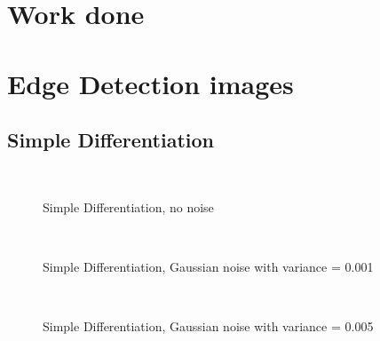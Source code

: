 \documentclass[10pt,a4paper]{article}
\begin{document}
\section{Work done}

\section{Edge Detection images}
\subsection{Simple Differentiation}
\begin{figure}
  \centering
     \\
  \caption{Simple Differentiation, no noise}
  \label{fig:sd_no_noise}
\end{figure}

\begin{figure}
  \centering
     \\
  \caption{Simple Differentiation, Gaussian noise with variance = 0.001}
  \label{fig:sd_001}
\end{figure}

\begin{figure}
  \centering
     \\
  \caption{Simple Differentiation, Gaussian noise with variance = 0.005}
  \label{fig:sd_005}
\end{figure}
\end{document}
